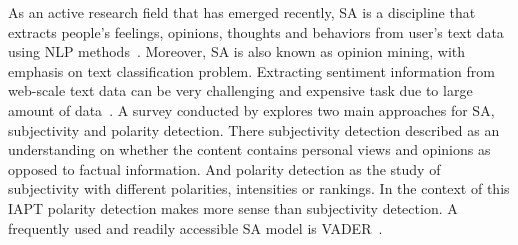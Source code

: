 As an active research field that has emerged recently, \ac{SA} is a discipline that extracts people’s feelings, opinions, thoughts and behaviors from user’s text data using \ac{NLP} methods~\citep{danneman2014social}.
Moreover, \ac{SA} is also known as opinion mining, with emphasis on text classification problem.
Extracting sentiment information from web-scale text data can be very challenging and expensive task due to large amount of data~\citep{FernndezGavilanes2016}.
A survey conducted by \citet{Lo2016} explores two main approaches for \ac{SA}, subjectivity and polarity detection.
There subjectivity detection described as an understanding on whether the content contains personal views and opinions as opposed to factual information.
And polarity detection as the study of subjectivity with different polarities, intensities or rankings.
In the context of this \ac{IAPT} polarity detection makes more sense than subjectivity detection.
A frequently used and readily accessible \ac{SA} model is \ac{VADER}~\citep{Hutto_Gilbert_2014}.



